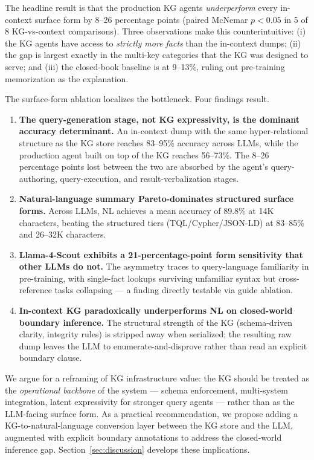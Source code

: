 The headline result is that the production KG agents
\emph{underperform} every in-context surface form by 8--26
percentage points (paired McNemar $p<0.05$ in 5 of 8 KG-vs-context
comparisons). Three observations make this counterintuitive:
(i) the KG agents have access to \emph{strictly more facts} than
the in-context dumps; (ii) the gap is largest exactly in the
multi-key categories that the KG was designed to serve; and
(iii) the closed-book baseline is at 9--13\%, ruling out
pre-training memorization as the explanation.

The surface-form ablation localizes the bottleneck. Four findings
result.

\begin{enumerate}
\item \textbf{The query-generation stage, not KG expressivity, is
      the dominant accuracy determinant.} An in-context dump with
      the same hyper-relational structure as the KG store reaches
      83--95\% accuracy across LLMs, while the production agent
      built on top of the KG reaches 56--73\%. The 8--26 percentage
      points lost between the two are absorbed by the agent's
      query-authoring, query-execution, and result-verbalization
      stages.
\item \textbf{Natural-language summary Pareto-dominates structured
      surface forms.} Across LLMs, NL achieves a mean accuracy of
      89.8\% at 14K characters, beating the structured tiers
      (TQL/Cypher/JSON-LD) at 83--85\% and 26--32K characters.
\item \textbf{Llama-4-Scout exhibits a 21-percentage-point form
      sensitivity that other LLMs do not.} The asymmetry traces to
      query-language familiarity in pre-training, with single-fact
      lookups surviving unfamiliar syntax but cross-reference tasks
      collapsing — a finding directly testable via guide ablation.
\item \textbf{In-context KG paradoxically underperforms NL on
      closed-world boundary inference.} The structural strength of
      the KG (schema-driven clarity, integrity rules) is stripped
      away when serialized; the resulting raw dump leaves the LLM
      to enumerate-and-disprove rather than read an explicit
      boundary clause.
\end{enumerate}

We argue for a reframing of KG infrastructure value: the KG should
be treated as the \emph{operational backbone} of the system —
schema enforcement, multi-system integration, latent expressivity
for stronger query agents — rather than as the LLM-facing surface
form. As a practical recommendation, we propose adding a
KG-to-natural-language conversion layer between the KG store and
the LLM, augmented with explicit boundary annotations to address
the closed-world inference gap. Section~\ref{sec:discussion}
develops these implications.

